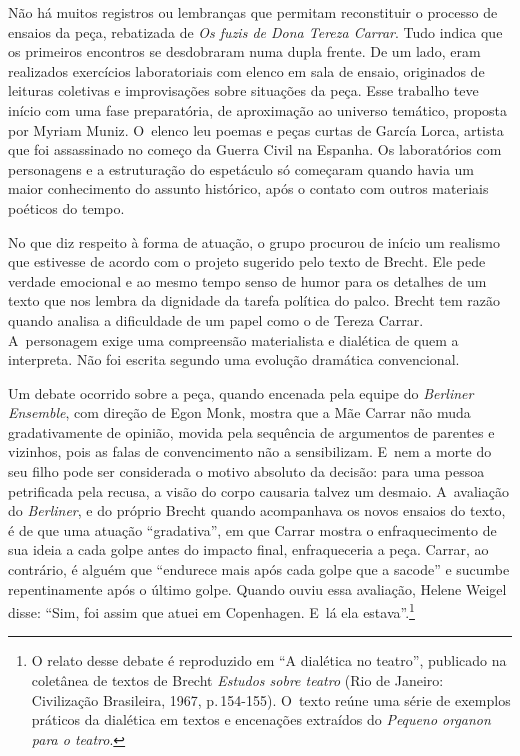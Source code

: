 {\subject{Ensaios e projeto cênico}

Não há muitos registros ou lembranças que permitam reconstituir o
processo de ensaios da peça, rebatizada de {\it Os fuzis de Dona Tereza
Carrar}. Tudo indica que os primeiros encontros se desdobraram numa
dupla frente. De um lado, eram realizados exercícios laboratoriais com
elenco em sala de ensaio, originados de leituras coletivas e
improvisações sobre situações da peça. Esse trabalho teve início com uma
fase preparatória, de aproximação ao universo temático, proposta por
Myriam Muniz. O~elenco leu poemas e peças curtas de García Lorca,
artista que foi assassinado no começo da Guerra Civil na Espanha. Os
laboratórios com personagens e a estruturação do espetáculo só começaram
quando havia um maior conhecimento do assunto histórico, após o contato
com outros materiais poéticos do tempo.

No que diz respeito à forma de atuação, o grupo procurou de início um
realismo que estivesse de acordo com o projeto sugerido pelo texto de
Brecht. Ele pede verdade emocional e ao mesmo tempo senso de humor para
os detalhes de um texto que nos lembra da dignidade da tarefa política
do palco. Brecht tem razão quando analisa a dificuldade de um papel como
o de Tereza Carrar. A~personagem exige uma compreensão materialista e
dialética de quem a interpreta. Não foi escrita segundo uma evolução
dramática convencional.

Um debate ocorrido sobre a peça, quando encenada pela equipe do
{\it Berliner Ensemble}, com direção de Egon Monk, mostra que a Mãe
Carrar não muda gradativamente de opinião, movida pela sequência de
argumentos de parentes e vizinhos, pois as falas de convencimento não a
sensibilizam. E~nem a morte do seu filho pode ser considerada o motivo
absoluto da decisão: para uma pessoa petrificada pela recusa, a visão do
corpo causaria talvez um desmaio. A~avaliação do {\it Berliner}, e do próprio
Brecht quando acompanhava os novos ensaios do texto, é de que uma
atuação “gradativa”, em que Carrar mostra o enfraquecimento de sua ideia
a cada golpe antes do impacto final, enfraqueceria a peça. Carrar, ao
contrário, é alguém que “endurece mais após cada golpe que a sacode” e
sucumbe repentinamente após o último golpe. Quando ouviu essa avaliação,
Helene Weigel disse: “Sim, foi assim que atuei em Copenhagen. E~lá ela
estava”.\footnote{O relato desse debate é reproduzido em “A dialética no
  teatro”, publicado na coletânea de textos de Brecht {\it Estudos sobre teatro} (Rio de Janeiro: Civilização Brasileira,
  1967, p.\,154-155). O~texto reúne uma série de exemplos práticos da
  dialética em textos e encenações extraídos do {\it Pequeno organon
  para o teatro}.}

}

